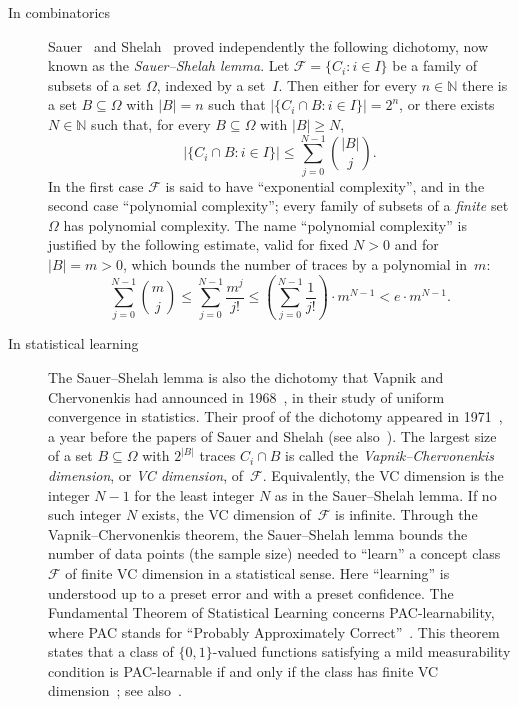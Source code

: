 \documentclass[psamsfonts]{amsart}
\theoremstyle{definition}
\theoremstyle{remark}
\numberwithin{equation}{section}
\begin{document}
\begin{description}
\item[In combinatorics]
  Sauer~\cite{Sauer:1972} and Shelah~\cite{Shelah:1972} proved independently the following dichotomy, now known as the \emph{Sauer--Shelah lemma}.
  Let $\mathscr{F}=\{C_i:i\in I\}$ be a family of subsets of a set $\Omega$, indexed by a set~$I$.
  Then either
  for every $n\in\mathbb{N}$ there is a set $B\subseteq \Omega$ with $|B|=n$ such that $|\{C_i\cap B: i\in I\}|=2^n$,
  or
  there exists $N\in\mathbb{N}$ such that, for every $B\subseteq \Omega$ with $|B|\ge N$,
  \[
    |\{C_i\cap B: i\in I\}| \le \sum_{j=0}^{N-1} \binom{|B|}{j}.
  \]
  In the first case $\mathscr{F}$ is said to have “exponential complexity”, and in the second case “polynomial complexity”;
  every family of subsets of a \emph{finite} set $\Omega$ has polynomial complexity.
  The name “polynomial complexity” is justified by the following estimate, valid for fixed $N>0$ and for $|B| = m > 0$, which bounds the number of traces by a polynomial in~$m$:
  \begin{equation*}
  \sum_{j=0}^{N-1} \binom{m}{j}
  \le \sum_{j=0}^{N-1}\frac{m^{j}}{j!}
  \le \left( \sum_{j=0}^{N-1}\frac{1}{j!} \right)\cdot m^{N-1}
  < e\cdot m^{N-1}.
  \end{equation*}

\item[In statistical learning]
  The Sauer--Shelah lemma is also the dichotomy that Vapnik and Chervonenkis had announced in 1968~\cite{Vapnik-Chervonenkis:1968}, in their study of uniform convergence in statistics.
  Their proof of the dichotomy appeared in 1971~\cite{Vapnik-Chervonenkis:1971}, a year before the papers of Sauer and Shelah (see also~\cite{Vapnik-Chervonenkis:1974}).
  The largest size of a set $B\subseteq \Omega$ with $2^{|B|}$ traces $C_i\cap B$ is called the \emph{Vapnik--Chervonenkis dimension}, or \emph{VC dimension}, of~$\mathscr{F}$.
  Equivalently, the VC dimension is the integer $N-1$ for the least integer $N$ as in the Sauer--Shelah lemma.
  If no such integer $N$ exists, the VC dimension of~$\mathscr{F}$ is infinite.
  Through the Vapnik--Chervonenkis theorem, the Sauer--Shelah lemma bounds the number of data points (the sample size) needed to “learn” a concept class~$\mathscr{F}$ of finite VC dimension in a statistical sense.
  Here “learning” is understood up to a preset error and with a preset confidence.
  The Fundamental Theorem of Statistical Learning concerns PAC-learnability, where PAC stands for “Probably Approximately Correct”~\cite{Valiant:1984}.
  This theorem states that a class of $\{0,1\}$-valued functions satisfying a mild measurability condition is PAC-learnable if and only if the class has finite VC dimension~\cite{Blumer-Ehrenfeucht-Haussler-Warmuth:1989};
  see also~\cite[Theorem~6.7]{Shalev-Shwartz-Ben-David:2014}.

\end{description}
\end{document}
